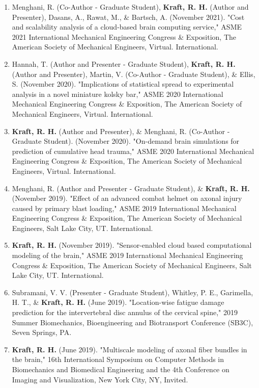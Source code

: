\documentclass[a4paper,10pt]{article}
\begin{document}
\begin{enumerate}
  \item Menghani, R. (Co-Author - Graduate Student), \textbf{\textbf{Kraft,} R. H.} (Author and Presenter), Dasans, A., Rawat, M., \&
 Bartsch, A. (November 2021). "Cost and scalability analysis of a cloud-based brain computing service," ASME 2021 International Mechanical Engineering Congress \&
 Exposition, The American Society of Mechanical Engineers, Virtual. International.
  \item Hannah, T. (Author and Presenter - Graduate Student), \textbf{\textbf{Kraft,} R. H.} (Author and Presenter), Martin, V. (Co-Author - Graduate Student), \&
 Ellis, S. (November 2020). "Implications of statistical spread to experimental analysis in a novel miniature kolsky bar," ASME 2020 International Mechanical Engineering Congress \&
 Exposition, The American Society of Mechanical Engineers, Virtual. International.
  \item \textbf{\textbf{Kraft,} R. H.} (Author and Presenter), \&
 Menghani, R. (Co-Author - Graduate Student). (November 2020). "On-demand brain simulations for prediction of cumulative head trauma," ASME 2020 International Mechanical Engineering Congress \&
 Exposition, The American Society of Mechanical Engineers, Virtual. International.
  \item Menghani, R. (Author and Presenter - Graduate Student), \&
 \textbf{\textbf{Kraft,} R. H.} (November 2019). "Effect of an advanced combat helmet on axonal injury caused by primary blast loading," ASME 2019 International Mechanical Engineering Congress \&
 Exposition, The American Society of Mechanical Engineers, Salt Lake City, UT. International.
  \item \textbf{\textbf{Kraft,} R. H.} (November 2019). "Sensor-enabled cloud based computational modeling of the brain," ASME 2019 International Mechanical Engineering Congress \&
 Exposition, The American Society of Mechanical Engineers, Salt Lake City, UT. International.
  \item Subramani, V. V. (Presenter - Graduate Student), Whitley, P. E., Garimella, H. T., \&
 \textbf{\textbf{Kraft,} R. H.} (June 2019). "Location-wise fatigue damage prediction for the intervertebral disc annulus of the cervical spine," 2019 Summer Biomechanics, Bioengineering and Biotransport Conference (SB3C), Seven Springs, PA.
  \item \textbf{\textbf{Kraft,} R. H.} (June 2019). "Multiscale modeling of axonal fiber bundles in the brain," 16th International Symposium on Computer Methods in Biomechanics and Biomedical Engineering and the 4th Conference on Imaging and Visualization, New York City, NY, Invited.

\end{enumerate}
\end{document}
